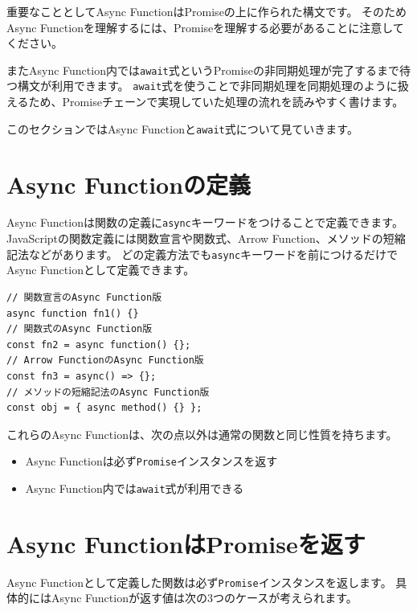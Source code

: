 重要なこととしてAsync FunctionはPromiseの上に作られた構文です。
そのためAsync
Functionを理解するには、Promiseを理解する必要があることに注意してください。

またAsync
Function内では\texttt{await}式というPromiseの非同期処理が完了するまで待つ構文が利用できます。
\texttt{await}式を使うことで非同期処理を同期処理のように扱えるため、Promiseチェーンで実現していた処理の流れを読みやすく書けます。

このセクションではAsync
Functionと\texttt{await}式について見ていきます。

\hypertarget{declare-async-function}{%
\section{Async Functionの定義}\label{declare-async-function}}

Async
Functionは関数の定義に\texttt{async}キーワードをつけることで定義できます。
JavaScriptの関数定義には関数宣言や関数式、Arrow
Function、メソッドの短縮記法などがあります。
どの定義方法でも\texttt{async}キーワードを前につけるだけでAsync
Functionとして定義できます。

\begin{lstlisting}
// 関数宣言のAsync Function版
async function fn1() {}
// 関数式のAsync Function版
const fn2 = async function() {};
// Arrow FunctionのAsync Function版
const fn3 = async() => {};
// メソッドの短縮記法のAsync Function版
const obj = { async method() {} };
\end{lstlisting}

これらのAsync Functionは、次の点以外は通常の関数と同じ性質を持ちます。

\begin{itemize}
\item
  Async
  Functionは必ず\texttt{Promise}インスタンスを返す
\item
  Async Function内では\texttt{await}式が利用できる
\end{itemize}

\hypertarget{async-function-return-promise}{%
\section{Async
FunctionはPromiseを返す}\label{async-function-return-promise}}

Async
Functionとして定義した関数は必ず\texttt{Promise}インスタンスを返します。
具体的にはAsync Functionが返す値は次の3つのケースが考えられます。


